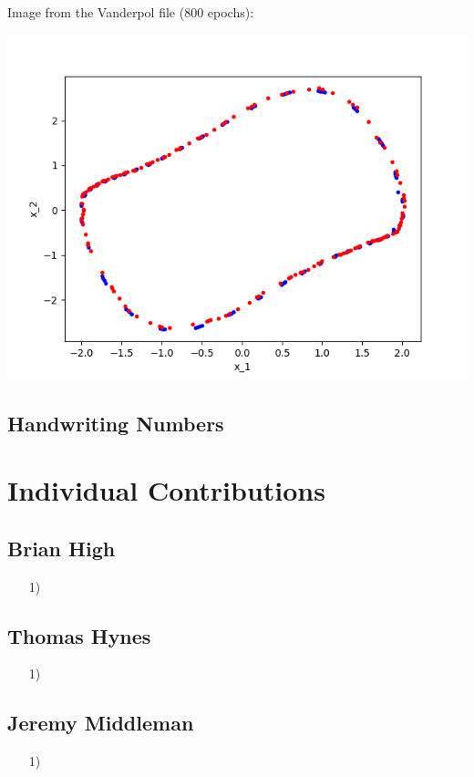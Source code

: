 \documentclass{article}
\begin{document}
\vspace{9cm}

Image from the Vanderpol file (800 epochs): 

\includegraphics[scale=1]{figs/800VanderpolODE.png}\\[0.5cm]

\vspace{9cm}

\subsection{Handwriting Numbers}

\section{Individual Contributions}

\subsection{Brian High}
\begin{itemize}
    \item[1)]
\end{itemize}

\subsection{Thomas Hynes}
\begin{itemize}
    \item[1)]
\end{itemize}

\subsection{Jeremy Middleman}
\begin{itemize}
    \item[1)]
\end{itemize}
\end{document}
